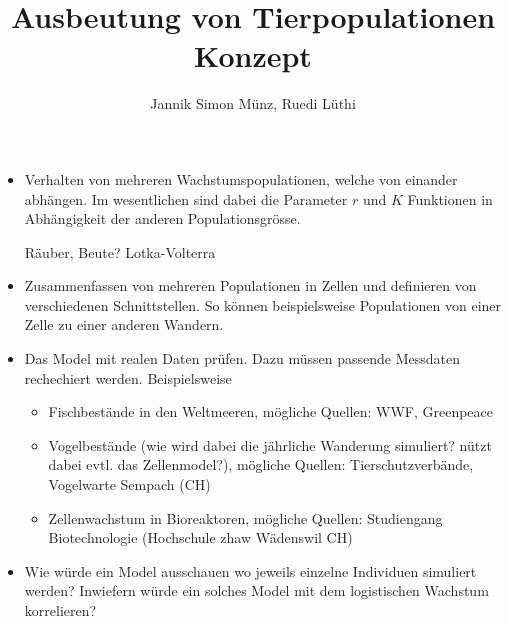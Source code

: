 \documentclass[11pt,a4paper]{article}
\title{Ausbeutung von Tierpopulationen \\ \textbf{Konzept} }
\author{Jannik Simon Münz, Ruedi Lüthi}
\begin{document}
	\maketitle
	
	\begin{itemize}
		\item Verhalten von mehreren Wachstumspopulationen, welche von einander abhängen. Im wesentlichen sind dabei die Parameter \(r\) und \(K\) Funktionen in Abhängigkeit der anderen Populationsgrösse. 
		
	Räuber, Beute? Lotka-Volterra
		
		\item Zusammenfassen von mehreren Populationen in Zellen und definieren von verschiedenen Schnittstellen. So können beispielsweise Populationen von einer Zelle zu einer anderen Wandern.
		
		\item Das Model mit realen Daten prüfen. Dazu müssen passende Messdaten rechechiert werden. Beispielsweise
			\begin{itemize}
				\item Fischbestände in den Weltmeeren, mögliche Quellen: WWF, Greenpeace
				\item Vogelbestände (wie wird dabei die jährliche Wanderung simuliert? nützt dabei evtl. das Zellenmodel?), mögliche Quellen: Tierschutzverbände, Vogelwarte Sempach (CH)
				\item Zellenwachstum in Bioreaktoren, mögliche Quellen: Studiengang Biotechnologie (Hochschule zhaw Wädenswil CH)
			\end{itemize}
			
		\item Wie würde ein Model ausschauen wo jeweils einzelne Individuen simuliert werden? Inwiefern würde ein solches Model mit dem logistischen Wachstum korrelieren?
		
	\end{itemize}
\end{document}
